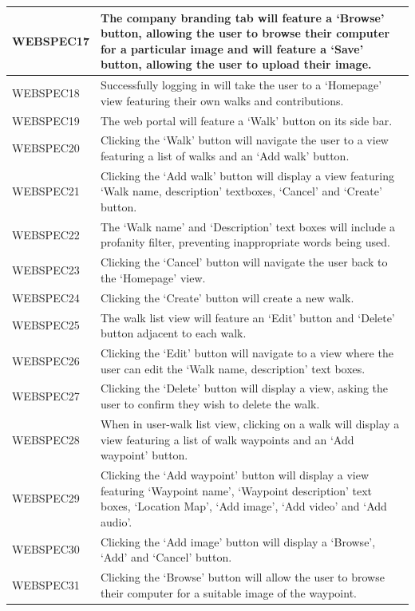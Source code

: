 \documentclass[11pt,a4paper]{article}
\begin{document}
\begin{longtable}{|p{2.5cm}p{13cm}|}
WEBSPEC17 & The company branding tab will feature a `Browse' button, allowing the user to browse their computer for a particular image and will feature a `Save' button, allowing the user to upload their image. \\ \hline
WEBSPEC18 & Successfully logging in will take the user to a `Homepage' view featuring their own walks and contributions. \\ \hline
WEBSPEC19 & The web portal will feature a `Walk' button on its side bar. \\ \hline
WEBSPEC20 & Clicking the `Walk' button will navigate the user to a view featuring a list of walks and an `Add walk' button. \\ \hline
WEBSPEC21 & Clicking the `Add walk' button will display a view featuring `Walk name, description' textboxes, `Cancel' and `Create' button. \\ \hline
WEBSPEC22 & The `Walk name' and `Description' text boxes will include a profanity filter, preventing inappropriate words being used. \\ \hline
WEBSPEC23 & Clicking the `Cancel' button will navigate the user back to the `Homepage' view. \\ \hline
WEBSPEC24 & Clicking the `Create' button will create a new walk. \\ \hline
WEBSPEC25 & The walk list view will feature an `Edit' button and `Delete' button adjacent to each walk. \\ \hline
WEBSPEC26 & Clicking the `Edit' button will navigate to a view where the user can edit the `Walk name, description' text boxes. \\ \hline
WEBSPEC27 & Clicking the `Delete' button will display a view, asking the user to confirm they wish to delete the walk. \\ \hline
WEBSPEC28 & When in user-walk list view, clicking on a walk will display a view featuring a list of walk waypoints and an `Add waypoint' button. \\ \hline
WEBSPEC29 & Clicking the `Add waypoint' button will display a view featuring `Waypoint name', `Waypoint description' text boxes, `Location Map', `Add image', `Add video' and `Add audio'. \\ \hline
WEBSPEC30 & Clicking the `Add image' button will display a `Browse', `Add' and `Cancel' button. \\ \hline
WEBSPEC31 & Clicking the `Browse' button will allow the user to browse their computer for a suitable image of the waypoint. \\ \hline

\end{longtable}
\end{document}
